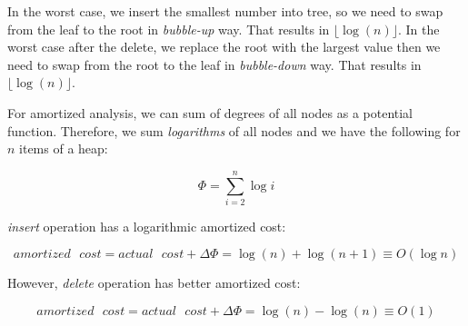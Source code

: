 In the worst case, we insert the smallest number into tree, so we need to swap from the leaf to the root in \textit{bubble-up} way. That results in $\lfloor \log(n) \rfloor $.
In the worst case after the delete, we replace the root with the largest value then we need to swap from the root to the leaf in \textit{bubble-down} way. That results in $\lfloor \log(n) \rfloor$.

For amortized analysis, we can sum of degrees of all nodes as a potential function. Therefore, we sum \textit{logarithms} of all nodes and we have the following for $n$ items of a heap:

  $$
    \Phi = \sum_{i=2}^{n} \log i
  $$

\textit{insert} operation has a logarithmic amortized cost:

  $$
    amortized\text{ }cost = actual\text{ }cost + \Delta\Phi = \log(n) + \log(n+1) \equiv O(\log n)
  $$
  
However, \textit{delete} operation has better amortized cost:

  $$
    amortized\text{ }cost = actual\text{ }cost + \Delta\Phi = \log(n) - \log(n) \equiv O(1)
  $$